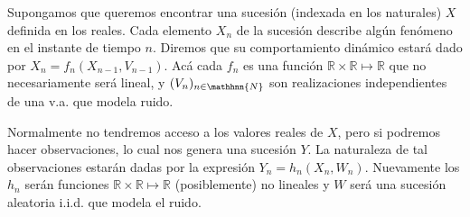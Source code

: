 \documentclass[letterpaper,11pt,oneside]{article}
\begin{document}
	





\inserttitle



\newp Supongamos que queremos encontrar una sucesión (indexada en los naturales) $X$ definida en los reales. Cada elemento $X_n$ de la sucesión describe algún fenómeno en el instante de tiempo $n$. Diremos que su comportamiento dinámico estará dado por $ X_n = f_n(X_{n-1},V_{n-1})$. Acá cada $f_n$ es una función $\mathbb{R}\times\mathbb{R}\mapsto\mathbb{R}$ que no necesariamente será lineal, y $(V_n)_{n\in\mathhnn{N}}$ son realizaciones independientes de una v.a. que modela ruido. 

\newp Normalmente no tendremos acceso a los valores reales de $X$, pero si podremos hacer observaciones, lo cual nos genera una sucesión $Y$. La naturaleza de tal observaciones estarán dadas por la expresión  $ Y_n = h_n(X_n,W_n)$. Nuevamente los $h_n$ serán funciones $\mathbb{R}\times\mathbb{R}\mapsto\mathbb{R}$ (posiblemente) no lineales y $W$ será una sucesión aleatoria i.i.d. que modela el ruido. %

\end{document}
